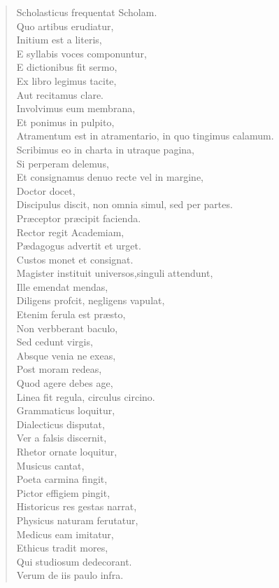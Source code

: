 \documentclass[12pt,  postvopaper]{memoir}
\begin{document}
\begin{verse}

  Scholasticus frequentat Scholam.\\
  Quo artibus erudiatur,\\
  Initium est a literis,\\
  E syllabis voces componuntur,\\
  E dictionibus fit sermo,\\
  Ex libro legimus tacite,\\
  Aut recitamus clare.\\
  Involvimus eum membrana,\\
  Et ponimus in pulpito,\\
  Atramentum est in atramentario, in quo tingimus calamum.\\
  Scribimus eo in charta in utraque pagina,\\
  Si perperam delemus,\\
  Et consignamus denuo recte vel in margine,\\
  Doctor docet,\\
  Discipulus discit, non omnia simul, sed per partes.\\
  Præceptor præcipit facienda.\\
  Rector regit Academiam,\\
  Pædagogus advertit et urget.\\
  Custos monet et consignat.\\
  Magister instituit universos,singuli attendunt,\\
  Ille emendat mendas,\\
  Diligens profcit, negligens vapulat,\\
  Etenim ferula est præsto,\\
  Non verbberant baculo,\\
  Sed cedunt virgis,\\
  Absque venia ne exeas,\\
  Post moram redeas,\\
  Quod agere debes age,\\
  Linea fit regula, circulus circino.\\
  Grammaticus loquitur,\\
  Dialecticus disputat,\\
  Ver a falsis discernit,\\
  Rhetor ornate loquitur,\\
  Musicus cantat,\\
  Poeta carmina fingit,\\
  Pictor effigiem pingit,\\
  Historicus res gestas narrat,\\
  Physicus naturam ferutatur,\\
  Medicus eam imitatur,\\
  Ethicus tradit mores,\\
  Qui studiosum dedecorant.\\
  Verum de iis paulo infra.\\
\end{verse}
\end{document}
